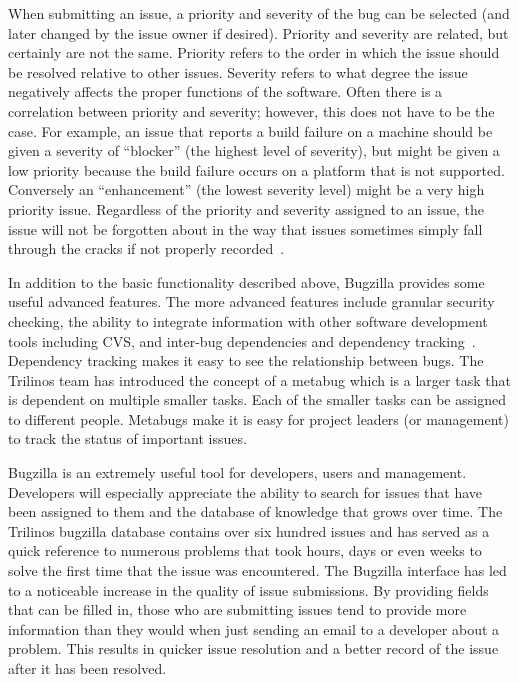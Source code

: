 \documentclass[12pt,relax]{article}
\begin{document}
When submitting an issue, a 
priority and severity of the bug can be selected (and later changed by the 
issue owner if desired).  Priority and severity are related, but certainly are 
not the same.  Priority refers to the order in which the issue should be 
resolved relative to other issues.  Severity refers to what degree the issue 
negatively affects the proper functions of the software.  Often there is a 
correlation between priority and severity; however, this does not have to be
the case.  For example, an issue that reports a build failure on a 
machine should be given a severity of ``blocker'' (the highest level of 
severity), but might be given a low priority because the build failure occurs
on a platform that is not supported.  Conversely an ``enhancement'' (the 
lowest severity level) might be a very high priority issue.  Regardless of the 
priority and severity assigned to an issue, the issue will not be forgotten 
about in the way that issues sometimes simply fall through the cracks if not 
properly recorded~\cite{Bugzilla}.

In addition to the basic functionality described above, Bugzilla provides some 
useful advanced features.  The more advanced features include
granular security checking, the ability to integrate information with 
other software development tools including CVS, and inter-bug 
dependencies and dependency tracking~\cite{Bugzilla}.  Dependency tracking 
makes it easy to see the relationship 
between bugs.  The Trilinos team has introduced the concept of a metabug which 
is a larger task that is dependent on multiple smaller tasks.  Each of the 
smaller tasks can be assigned to different people. Metabugs make it is easy 
for project leaders (or management) to track the status of important issues. 

Bugzilla is an extremely useful tool for developers, users and management.  
Developers will especially appreciate the ability to search for issues 
that have been assigned to them and the database of knowledge that grows over
time.  The Trilinos bugzilla database contains over six hundred issues and 
has served as a quick reference to numerous problems that took hours, days 
or even weeks to solve the first time that the issue was encountered.  The 
Bugzilla interface has led to a noticeable increase in the quality of 
issue submissions.  By providing fields that can be filled in, those who are 
submitting issues tend to provide more information than they would when just 
sending an email to a developer about a problem.  This results in quicker 
issue resolution and a better record of the issue after it has been resolved.  
\end{document}
